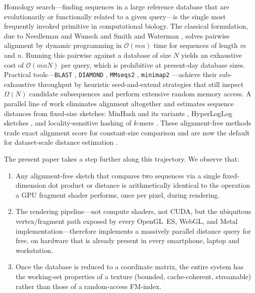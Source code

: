 \documentclass[twocolumn,11pt,a4paper]{article}
\theoremstyle{definition}
\theoremstyle{remark}
\newcommand{\bigO}{\mathcal{O}}
\begin{document}
Homology search---finding sequences in a large reference database that are
evolutionarily or functionally related to a given query---is the single most
frequently invoked primitive in computational biology. The classical
formulation, due to Needleman and Wunsch \citep{needleman1970} and Smith and
Waterman \citep{smith1981}, solves pairwise alignment by dynamic programming
in $\bigO(mn)$ time for sequences of length $m$ and $n$. Running this
pairwise against a database of size $N$ yields an exhaustive cost of
$\bigO(mnN)$ per query, which is prohibitive at present-day database sizes.
Practical tools---\texttt{BLAST} \citep{altschul1990,altschul1997},
\texttt{DIAMOND} \citep{buchfink2015,buchfink2021}, \texttt{MMseqs2}
\citep{steinegger2017}, \texttt{minimap2} \citep{li2018}---achieve their
sub-exhaustive throughput by heuristic seed-and-extend strategies that still
inspect $\Omega(N)$ candidate subsequences and perform extensive random memory
access. A parallel line of work eliminates alignment altogether and estimates
sequence distances from fixed-size sketches: MinHash and its variants
\citep{broder1997,ondov2016}, HyperLogLog sketches \citep{flajolet2007,baker2019},
and locality-sensitive hashing of $k$-mers \citep{indyk1998,andoni2006}. These
alignment-free methods trade exact alignment score for constant-size
comparison and are now the default for dataset-scale distance estimation
\citep{vinga2003,zielezinski2017,pierce2019,wood2019}.

The present paper takes a step further along this trajectory. We observe
that:
\begin{enumerate}
    \item Any alignment-free sketch that compares two sequences via a single
    fixed-dimension dot product or distance is arithmetically identical to
    the operation a GPU fragment shader performs, once per pixel, during
    rendering.
    \item The rendering pipeline---not compute shaders, not CUDA, but the
    ubiquitous vertex/fragment path exposed by every OpenGL~ES, WebGL, and
    Metal implementation---therefore implements a massively parallel
    distance query for free, on hardware that is already present in every
    smartphone, laptop and workstation.
    \item Once the database is reduced to a coordinate matrix, the entire
    system has the working-set properties of a texture (bounded,
    cache-coherent, streamable) rather than those of a random-access FM-index.
\end{enumerate}
\end{document}
